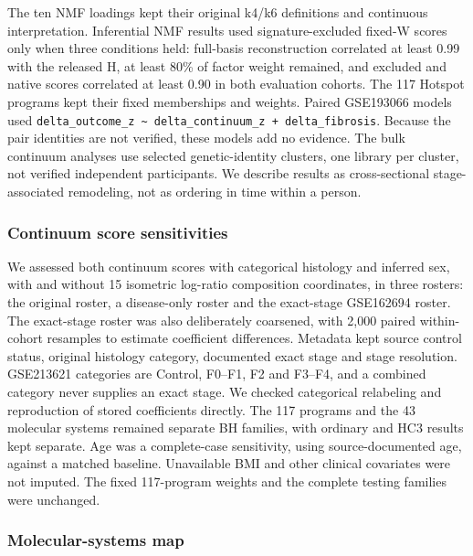 The ten NMF loadings kept their original k4/k6 definitions and continuous interpretation. Inferential NMF results used signature-excluded fixed-W scores only when three conditions held: full-basis reconstruction correlated at least 0.99 with the released H, at least 80\% of factor weight remained, and excluded and native scores correlated at least 0.90 in both evaluation cohorts. The 117 Hotspot programs kept their fixed memberships and weights. Paired GSE193066 models used \texttt{delta\_\allowbreak{}outcome\_\allowbreak{}z\ \textasciitilde{}\ delta\_\allowbreak{}continuum\_\allowbreak{}z\ +\ delta\_\allowbreak{}fibrosis}. Because the pair identities are not verified, these models add no evidence. The bulk continuum analyses use selected genetic-identity clusters, one library per cluster, not verified independent participants. We describe results as cross-sectional stage-associated remodeling, not as ordering in time within a person.

\subsubsection{Continuum score sensitivities}\label{continuum-score-sensitivities}

We assessed both continuum scores with categorical histology and inferred sex, with and without 15 isometric log-ratio composition coordinates, in three rosters: the original roster, a disease-only roster and the exact-stage GSE162694 roster. The exact-stage roster was also deliberately coarsened, with 2,000 paired within-cohort resamples to estimate coefficient differences. Metadata kept source control status, original histology category, documented exact stage and stage resolution. GSE213621 categories are Control, F0--F1, F2 and F3--F4, and a combined category never supplies an exact stage. We checked categorical relabeling and reproduction of stored coefficients directly. The 117 programs and the 43 molecular systems remained separate BH families, with ordinary and HC3 results kept separate. Age was a complete-case sensitivity, using source-documented age, against a matched baseline. Unavailable BMI and other clinical covariates were not imputed. The fixed 117-program weights and the complete testing families were unchanged.

\subsubsection{Molecular-systems map}\label{molecular-systems-map}


